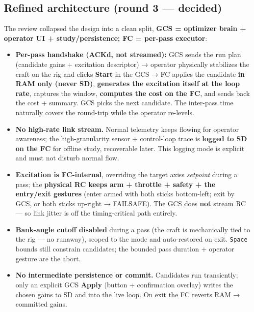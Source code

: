 \documentclass[
  11pt,
]{article}
\providecommand{\tightlist}{%
  \setlength{\itemsep}{0pt}\setlength{\parskip}{0pt}}
\begin{document}
\hypertarget{refined-architecture-round-3--decided}{%
\subsection{Refined architecture (round 3 ---
decided)}\label{refined-architecture-round-3--decided}}

The review collapsed the design into a clean split, \textbf{GCS =
optimizer brain + operator UI + study/persistence; FC = per-pass
executor}:

\begin{itemize}
\tightlist
\item
  \textbf{Per-pass handshake (ACK\textquotesingle d, not streamed):} GCS
  sends the run plan (candidate gains + excitation descriptor) →
  operator physically stabilizes the craft on the rig and clicks
  \textbf{Start} in the GCS → FC applies the candidate \textbf{in RAM
  only (never SD)}, \textbf{generates the excitation itself at the loop
  rate}, captures the window, \textbf{computes the cost on the FC}, and
  sends back the cost + summary. GCS picks the next candidate. The
  inter-pass time naturally covers the round-trip while the operator
  re-levels.
\item
  \textbf{No high-rate link stream.} Normal telemetry keeps flowing for
  operator awareness; the high-granularity sensor + control-loop trace
  is \textbf{logged to SD on the FC} for offline study, recoverable
  later. This logging mode is explicit and must not disturb normal flow.
\item
  \textbf{Excitation is FC-internal}, overriding the target
  axis\textquotesingle s \emph{setpoint} during a pass; the
  \textbf{physical RC keeps arm + throttle + safety + the entry/exit
  gestures} (enter armed with both sticks bottom-left; exit by GCS, or
  both sticks up-right → FAILSAFE). The GCS does \textbf{not} stream RC
  --- so link jitter is off the timing-critical path entirely.
\item
  \textbf{Bank-angle cutoff disabled} during a pass (the craft is
  mechanically tied to the rig --- no runaway), scoped to the mode and
  auto-restored on exit. \texttt{Space} bounds still constrain
  candidates; the bounded pass duration + operator gesture are the
  abort.
\item
  \textbf{No intermediate persistence or commit.} Candidates run
  transiently; only an explicit GCS \textbf{Apply} (button +
  confirmation overlay) writes the chosen gains to SD and into the live
  loop. On exit the FC reverts RAM → committed gains.

\end{itemize}
\end{document}
